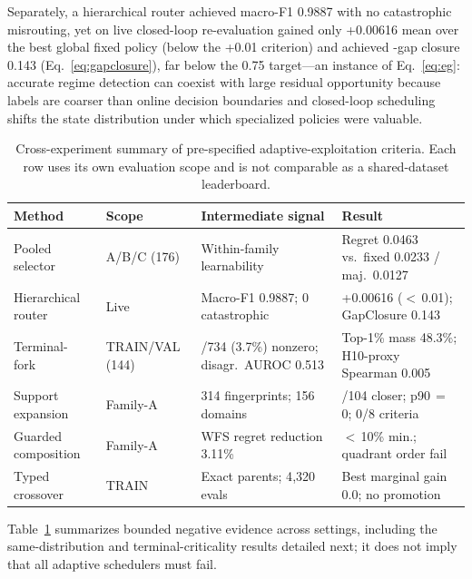 \documentclass[runningheads]{llncs}
\begin{document}
Separately, a hierarchical router achieved macro-F1 0.9887 with no
catastrophic misrouting, yet on live closed-loop re-evaluation gained only
+0.00616 mean \anwg{} over the best global fixed policy (below the +0.01
criterion) and achieved \vbs{}-gap closure 0.143 (Eq.~\ref{eq:gapclosure}),
far below the 0.75 target---an instance of Eq.~\ref{eq:eg}: accurate regime
detection can coexist with large residual opportunity because labels are
coarser than online decision boundaries and closed-loop scheduling shifts the
state distribution under which specialized policies were valuable.

\begin{table}
\centering
\footnotesize
\caption{Cross-experiment summary of pre-specified adaptive-exploitation
criteria. Each row uses its own evaluation scope and is not comparable as a
shared-dataset leaderboard.}
\label{tab:adaptive-criteria}
\setlength{\tabcolsep}{4pt}
\renewcommand{\arraystretch}{1.0}
\begin{tabular}{@{}>{\raggedright\arraybackslash}p{}
  >{\raggedright\arraybackslash}p{}
  >{\raggedright\arraybackslash}p{}
  >{\raggedright\arraybackslash}p{}@{}}
\toprule
Method & Scope & Intermediate signal & Result \\
\midrule
Pooled selector &
A/B/C (176) &
Within-family learnability &
Regret 0.0463 vs.\ fixed 0.0233 / maj.\ 0.0127 \\
Hierarchical router &
Live &
Macro-F1 0.9887; 0 catastrophic &
+0.00616 \anwg{} ($<$\,0.01); GapClosure 0.143 \\
Terminal-\anwg{} fork &
TRAIN/VAL (144) &
27/734 (3.7\%) nonzero; disagr.\ AUROC 0.513 &
Top-1\% mass 48.3\%; H10-proxy Spearman 0.005 \\
Support expansion &
Family-A &
24{,}314 fingerprints; 156 domains &
1/104 closer; p90\,$=$\,0; 0/8 criteria \\
Guarded composition &
Family-A &
WFS regret reduction 3.11\% &
$<$\,10\% min.; quadrant order fail \\
Typed crossover &
24 TRAIN &
Exact parents; 4{,}320 evals &
Best marginal gain 0.0; no promotion \\
\bottomrule
\end{tabular}
\renewcommand{\arraystretch}{1}
\end{table}

Table~\ref{tab:adaptive-criteria} summarizes bounded negative evidence across
settings, including the same-distribution and terminal-criticality results
detailed next; it does not imply that all adaptive schedulers must fail.
\end{document}
